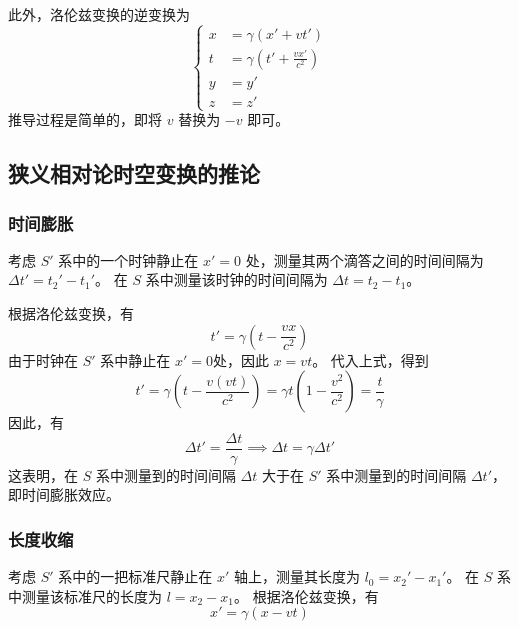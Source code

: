 此外，洛伦兹变换的逆变换为
\begin{equation}
    \left\{
    \begin{aligned}
        x & = \gamma (x' + v t')                        \\
        t & = \gamma \left(t' + \frac{v x'}{c^2}\right) \\
        y & = y'                                        \\
        z & = z'
    \end{aligned}
    \right.
\end{equation}
推导过程是简单的，即将 $v$ 替换为 $-v$ 即可。

\subsection{狭义相对论时空变换的推论}

\subsubsection{时间膨胀}

考虑 $S'$ 系中的一个时钟静止在 $x' = 0$ 处，测量其两个滴答之间的时间间隔为 $\Delta t' = t_2' - t_1'$。
在 $S$ 系中测量该时钟的时间间隔为 $\Delta t = t_2 - t_1$。

根据洛伦兹变换，有
\begin{equation}
    t' = \gamma \left(t - \frac{v x}{c^2}\right)
\end{equation}
由于时钟在 $S'$ 系中静止在 $x' = 0$处，因此 $x = v t$。
代入上式，得到
\begin{equation}
    t' = \gamma \left(t - \frac{v (v t)}{c^2}\right) = \gamma t \left(1 - \frac{v^2}{c^2}\right) = \frac{t}{\gamma}
\end{equation}
因此，有
\begin{equation}
    \Delta t' = \frac{\Delta t}{\gamma} \implies \Delta t = \gamma \Delta t'
\end{equation}
这表明，在 $S$ 系中测量到的时间间隔 $\Delta t$ 大于在 $S'$ 系中测量到的时间间隔 $\Delta t'$，即时间膨胀效应。

\subsubsection{长度收缩}

考虑 $S'$ 系中的一把标准尺静止在 $x'$ 轴上，测量其长度为 $l_0 = x_2' - x_1'$。
在 $S$ 系中测量该标准尺的长度为 $l = x_2 - x_1$。
根据洛伦兹变换，有
\begin{equation}
    x' = \gamma (x - v t)
\end{equation}


